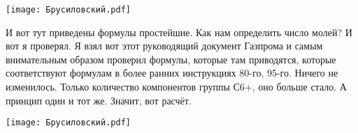\documentclass[main.tex]{subfiles}
\begin{document}
\begin{center}
\texttt{[image: Брусиловский.pdf]}
\end{center}

И вот тут приведены формулы простейшие.
Как нам определить число молей?
И вот я проверял.
Я взял вот этот руководящий документ Газпрома и самым внимательным образом проверил формулы, которые там приводятся, которые соответствуют формулам в более ранних инструкциях 80-го, 95-го.
Ничего не изменилось.
Только количество компонентов группы С6+, оно больше стало.
А принцип один и тот же.
Значит, вот расчёт.

\begin{center}
\texttt{[image: Брусиловский.pdf]}
\end{center}
\end{document}
